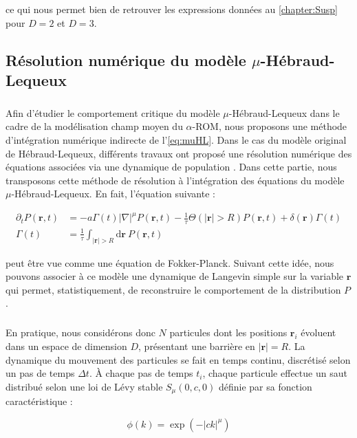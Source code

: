 \noindent ce qui nous permet bien de retrouver les expressions données au \autoref{chapter:Susp} pour $D=2$ et $D=3$.

\subsection{Résolution numérique du modèle $\mu$-Hébraud-Lequeux}

\label{sec:ResolNumMuHL}

\subparagraph{}Afin d'étudier le comportement critique du modèle $\mu$-Hébraud-Lequeux dans le cadre de la modélisation champ moyen du $\alpha$-ROM, nous proposons une méthode d'intégration numérique indirecte de l'\autoref{eq:muHL}. Dans le cas du modèle original de Hébraud-Lequeux, différents travaux ont proposé une résolution numérique des équations associées via une dynamique de population \cite{bouchaud_spontaneous_2016}. Dans cette partie, nous transposons cette méthode de résolution à l'intégration des équations du modèle $\mu$-Hébraud-Lequeux. En fait, l'équation suivante : 

\begin{equation}
\begin{aligned}
    \partial_t P(\mathbf{r}, t) &= -a\Gamma (t)|\nabla|^{\mu} P(\mathbf{r}, t) - \frac{1}{\tau}\Theta(|\mathbf{r}|>R)P(\mathbf{r}, t) + \delta(\mathbf{r})\Gamma (t)\\
     \Gamma (t) &= \frac{1}{\tau}\int_{|\mathbf{r}|>R}\mathrm{d}\mathbf{r}~P(\mathbf{r}, t)
\end{aligned}
\end{equation}

\noindent peut être vue comme une équation de Fokker-Planck. Suivant cette idée, nous pouvons associer à ce modèle une dynamique de Langevin simple sur la variable $\mathbf{r}$ qui permet, statistiquement, de reconstruire le comportement de la distribution $P$.

\subparagraph{}En pratique, nous considérons donc $N$ particules dont les positions $\mathbf{r}_i$ évoluent dans un espace de dimension $D$, présentant une barrière en $|\mathbf{r}|=R$. La dynamique du mouvement des particules se fait en temps continu, discrétisé selon un pas de temps $\Delta t$. \`A chaque pas de temps $t_i$, chaque particule effectue un saut distribué selon une loi de Lévy stable $S_\mu(0,c,0)$ définie par sa fonction caractéristique :

\begin{equation}
	\phi(k) = \exp (-|ck|^\mu)
\end{equation}

